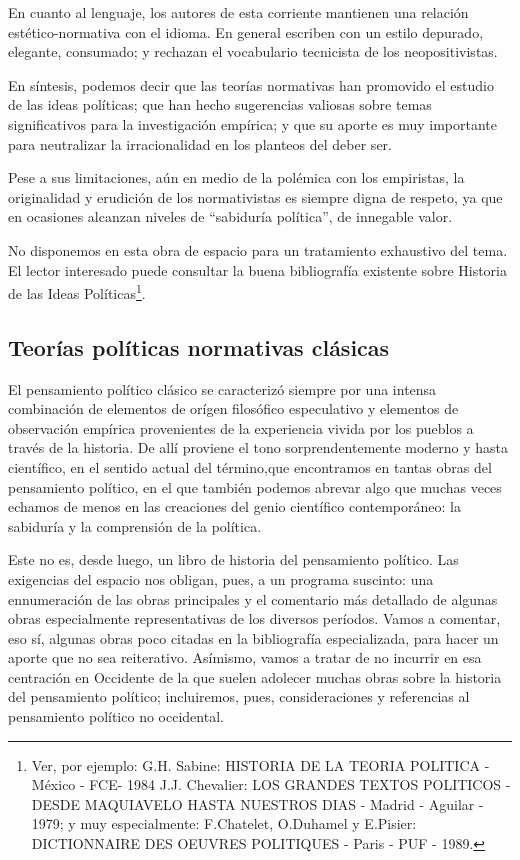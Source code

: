 \documentclass[
]{book}
\begin{document}
En cuanto al lenguaje, los autores de esta corriente mantienen una relación estético-normativa con el idioma. En general escriben con un estilo depurado, elegante, consumado; y rechazan el vocabulario tecnicista de los neopositivistas.

En síntesis, podemos decir que las teorías normativas han promovido el estudio de las ideas políticas; que han hecho sugerencias valiosas sobre temas significativos para la investigación empírica; y que su aporte es muy importante para neutralizar la irracionalidad en los planteos del deber ser.

Pese a sus limitaciones, aún en medio de la polémica con los empiristas, la originalidad y erudición de los normativistas es siempre digna de respeto, ya que en ocasiones alcanzan niveles de ``sabiduría política'', de innegable valor.

No disponemos en esta obra de espacio para un tratamiento exhaustivo del tema. El lector interesado puede consultar la buena bibliografía existente sobre Historia de las Ideas Políticas\footnote{Ver, por ejemplo: G.H. Sabine: HISTORIA DE LA TEORIA POLITICA - México - FCE- 1984 J.J. Chevalier: LOS GRANDES TEXTOS POLITICOS - DESDE MAQUIAVELO HASTA NUESTROS DIAS - Madrid - Aguilar - 1979; y muy especialmente: F.Chatelet, O.Duhamel y E.Pisier: DICTIONNAIRE DES OEUVRES POLITIQUES - Paris - PUF - 1989.}.

\hypertarget{teoruxedas-poluxedticas-normativas-cluxe1sicas}{%
\subsection*{Teorías políticas normativas clásicas}\label{teoruxedas-poluxedticas-normativas-cluxe1sicas}}

El pensamiento político clásico se caracterizó siempre por una intensa combinación de elementos de orígen filosófico especulativo y elementos de observación empírica provenientes de la experiencia vivida por los pueblos a través de la historia. De allí proviene el tono sorprendentemente moderno y hasta científico, en el sentido actual del término,que encontramos en tantas obras del pensamiento político, en el que también podemos abrevar algo que muchas veces echamos de menos en las creaciones del genio científico contemporáneo: la sabiduría y la comprensión de la política.

Este no es, desde luego, un libro de historia del pensamiento político. Las exigencias del espacio nos obligan, pues, a un programa suscinto: una ennumeración de las obras principales y el comentario más detallado de algunas obras especialmente representativas de los diversos períodos. Vamos a comentar, eso sí, algunas obras poco citadas en la bibliografía especializada, para hacer un aporte que no sea reiterativo. Asímismo, vamos a tratar de no incurrir en esa centración en Occidente de la que suelen adolecer muchas obras sobre la historia del pensamiento político; incluiremos, pues, consideraciones y referencias al pensamiento político no occidental.
\end{document}
